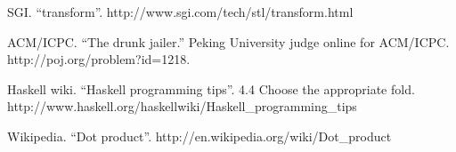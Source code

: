 \documentclass[UTF8]{article}
\begin{document}
\begin{thebibliography}{99}
SGI. ``transform''. http://www.sgi.com/tech/stl/transform.html

ACM/ICPC. ``The drunk jailer.'' Peking University judge online for ACM/ICPC. http://poj.org/problem?id=1218.

Haskell wiki. ``Haskell programming tips''. 4.4 Choose the appropriate fold. http://www.haskell.org/haskellwiki/Haskell\_programming\_tips

Wikipedia. ``Dot product''. http://en.wikipedia.org/wiki/Dot\_product

\end{thebibliography}

\ifx\wholebook\relax \else
\end{document}
